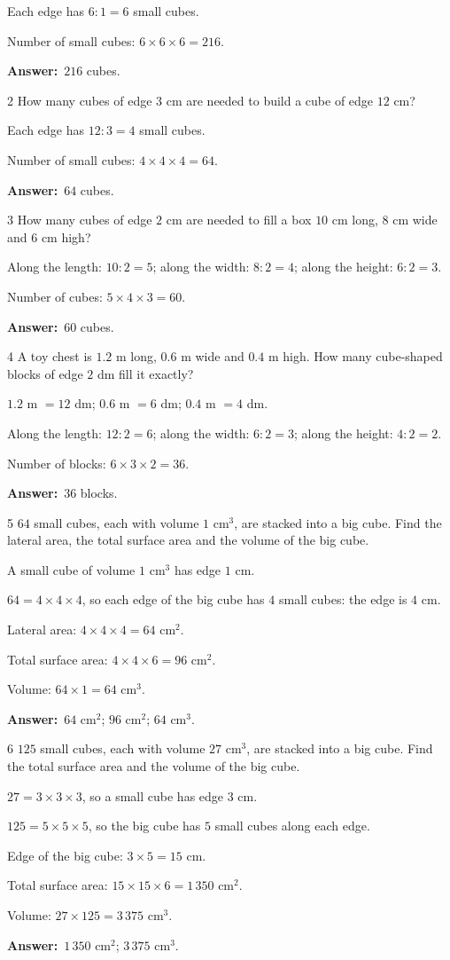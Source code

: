 \documentclass[11pt]{article}
\newif\ifsol \solfalse
\providecommand{\AnsWord}{Đáp số}
\newcommand{\dapso}[1]{\par\textbf{\AnsWord:}\ #1}
\newcommand{\probsol}[1]{%
  \begin{lrbox}{\solmeasure}\begin{minipage}{\dimexpr\linewidth-24pt\relax}#1\end{minipage}\end{lrbox}%
  \ifsol
    \begin{solbox}#1\end{solbox}%
  \else
    \setlength{\solht}{\dimexpr\ht\solmeasure+\dp\solmeasure+0.85cm\relax}%
    \ifdim\solht<1.35cm\setlength{\solht}{1.35cm}\fi
    \begin{tcolorbox}[colback=white,colframe=Line,boxrule=0.8pt,arc=5pt,
      left=8pt,right=8pt,top=4pt,bottom=4pt,height=\solht]{\footnotesize\color{Slate}\itshape\WorkWord}\end{tcolorbox}%
  \fi}
\newcommand{\gap}{\vspace{0.3cm}}
\def\WorkWord{Your work:}
\def\AnsWord{Answer}
\begin{document}
\probsol{
Each edge has $6:1=6$ small cubes.\par
Number of small cubes: $6\times6\times6=216$.
\dapso{$216$ cubes.}}
\gap
\begin{probbox}{2}{\relax}
How many cubes of edge $3$ cm are needed to build a cube of edge $12$ cm?
\end{probbox}
\probsol{
Each edge has $12:3=4$ small cubes.\par
Number of small cubes: $4\times4\times4=64$.
\dapso{$64$ cubes.}}
\gap
\begin{probbox}{3}{\relax}
How many cubes of edge $2$ cm are needed to fill a box $10$ cm long, $8$ cm wide and $6$ cm high?
\end{probbox}
\probsol{
Along the length: $10:2=5$; along the width: $8:2=4$; along the height: $6:2=3$.\par
Number of cubes: $5\times4\times3=60$.
\dapso{$60$ cubes.}}
\gap
\begin{probbox}{4}{\relax}
A toy chest is $1.2$ m long, $0.6$ m wide and $0.4$ m high. How many cube-shaped blocks of edge $2$ dm fill it exactly?
\end{probbox}
\probsol{
$1.2$ m $=12$ dm; $0.6$ m $=6$ dm; $0.4$ m $=4$ dm.\par
Along the length: $12:2=6$; along the width: $6:2=3$; along the height: $4:2=2$.\par
Number of blocks: $6\times3\times2=36$.
\dapso{$36$ blocks.}}
\gap
\begin{probbox}{5}{\relax}
$64$ small cubes, each with volume $1$ cm$^3$, are stacked into a big cube. Find the lateral area, the total surface area and the volume of the big cube.
\end{probbox}
\probsol{
A small cube of volume $1$ cm$^3$ has edge $1$ cm.\par
$64=4\times4\times4$, so each edge of the big cube has $4$ small cubes: the edge is $4$ cm.\par
Lateral area: $4\times4\times4=64$ cm$^2$.\par
Total surface area: $4\times4\times6=96$ cm$^2$.\par
Volume: $64\times1=64$ cm$^3$.
\dapso{$64$ cm$^2$; $96$ cm$^2$; $64$ cm$^3$.}}
\gap
\begin{probbox}{6}{\relax}
$125$ small cubes, each with volume $27$ cm$^3$, are stacked into a big cube. Find the total surface area and the volume of the big cube.
\end{probbox}
\probsol{
$27=3\times3\times3$, so a small cube has edge $3$ cm.\par
$125=5\times5\times5$, so the big cube has $5$ small cubes along each edge.\par
Edge of the big cube: $3\times5=15$ cm.\par
Total surface area: $15\times15\times6=1\,350$ cm$^2$.\par
Volume: $27\times125=3\,375$ cm$^3$.
\dapso{$1\,350$ cm$^2$; $3\,375$ cm$^3$.}}
\end{document}
